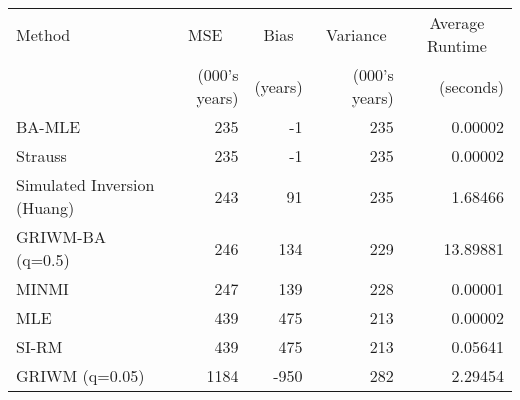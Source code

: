 
\begin{tabular}{lrrrr}
\toprule
\multicolumn{1}{l}{Method} & \multicolumn{1}{c}{MSE} & \multicolumn{1}{c}{Bias} & \multicolumn{1}{c}{Variance} & \multicolumn{1}{c}{Average Runtime} \\
 & (000's years) & (years) & (000's years) & (seconds)\\
\midrule
BA-MLE & 235 & -1 & 235 & 0.00002\\
Strauss & 235 & -1 & 235 & 0.00002\\
Simulated Inversion (Huang) & 243 & 91 & 235 & 1.68466\\
GRIWM-BA (q=0.5) & 246 & 134 & 229 & 13.89881\\
MINMI & 247 & 139 & 228 & 0.00001\\
\addlinespace
MLE & 439 & 475 & 213 & 0.00002\\
SI-RM & 439 & 475 & 213 & 0.05641\\
GRIWM (q=0.05) & 1184 & -950 & 282 & 2.29454\\
\bottomrule
\end{tabular}
